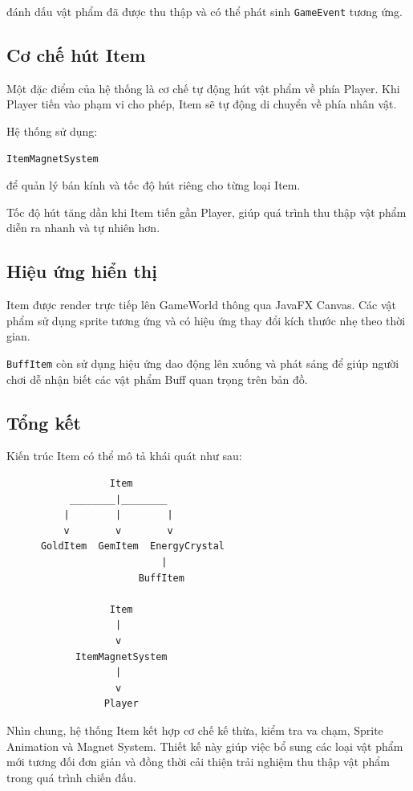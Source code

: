 \documentclass[12pt,a4paper]{report}
\begin{document}
    đánh dấu vật phẩm đã được thu thập và có thể phát sinh
    \texttt{GameEvent} tương ứng.

    \subsection{Cơ chế hút Item}

    Một đặc điểm của hệ thống là cơ chế tự động hút vật phẩm về phía
    Player. Khi Player tiến vào phạm vi cho phép, Item sẽ tự động
    di chuyển về phía nhân vật.

    Hệ thống sử dụng:

    \begin{verbatim}
ItemMagnetSystem
    \end{verbatim}

    để quản lý bán kính và tốc độ hút riêng cho từng loại Item.

    Tốc độ hút tăng dần khi Item tiến gần Player, giúp quá trình
    thu thập vật phẩm diễn ra nhanh và tự nhiên hơn.

    \subsection{Hiệu ứng hiển thị}

    Item được render trực tiếp lên GameWorld thông qua JavaFX Canvas.
    Các vật phẩm sử dụng sprite tương ứng và có hiệu ứng thay đổi
    kích thước nhẹ theo thời gian.

    \texttt{BuffItem} còn sử dụng hiệu ứng dao động lên xuống và
    phát sáng để giúp người chơi dễ nhận biết các vật phẩm Buff
    quan trọng trên bản đồ.

    \subsection{Tổng kết}

    Kiến trúc Item có thể mô tả khái quát như sau:

    \begin{verbatim}
                  Item
           ________|________
          |        |        |
          v        v        v
      GoldItem  GemItem  EnergyCrystal
                           |
                       BuffItem

                  Item
                   |
                   v
            ItemMagnetSystem
                   |
                   v
                 Player
    \end{verbatim}
    Nhìn chung, hệ thống Item kết hợp cơ chế kế thừa, kiểm tra va chạm,
    Sprite Animation và Magnet System. Thiết kế này giúp việc bổ sung
    các loại vật phẩm mới tương đối đơn giản và đồng thời cải thiện
    trải nghiệm thu thập vật phẩm trong quá trình chiến đấu.
\end{document}
